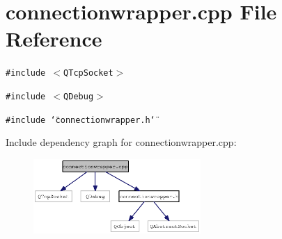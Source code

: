 \section{connectionwrapper.cpp File Reference}
\label{connectionwrapper_8cpp}
{\tt \#include $<$QTcpSocket$>$}\par
{\tt \#include $<$QDebug$>$}\par
{\tt \#include \char`\"{}connectionwrapper.h\char`\"{}}\par


Include dependency graph for connectionwrapper.cpp:\nopagebreak
\begin{figure}[H]
\begin{center}
\leavevmode
\includegraphics[width=180pt]{connectionwrapper_8cpp__incl}
\end{center}
\end{figure}
